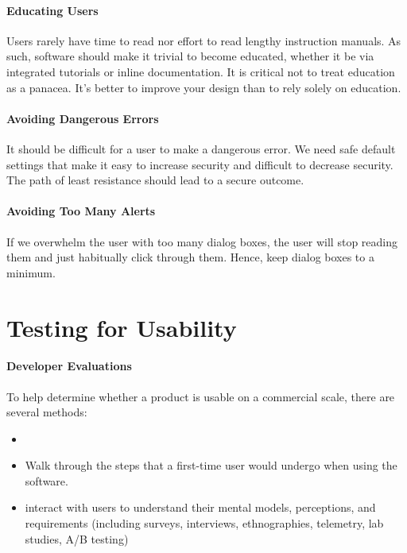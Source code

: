 \paragraph{Educating Users}
Users rarely have time to read nor effort to read lengthy instruction manuals. As such, software should make it trivial to become educated, whether it be via integrated tutorials or inline documentation. It is critical not to treat education as a panacea. It's better to improve your design than to rely solely on education.

\paragraph{Avoiding Dangerous Errors}
It should be difficult for a user to make a dangerous error. We need safe default settings that make it easy to increase security and difficult to decrease security. The path of least resistance should lead to a secure outcome.

\paragraph{Avoiding Too Many Alerts}
If we overwhelm the user with too many dialog boxes, the user will stop reading them and just habitually click through them. Hence, keep dialog boxes to a minimum.

\section{Testing for Usability}
\paragraph{Developer Evaluations}
To help determine whether a product is usable on a commercial scale, there are several methods:
\begin{itemize}
    \item {}
    \item {} Walk through the steps that a first-time user would undergo when using the software.
    \item {} interact with users to understand their mental models, perceptions, and requirements (including surveys, interviews, ethnographies, telemetry, lab studies, A/B testing)
\end{itemize}
